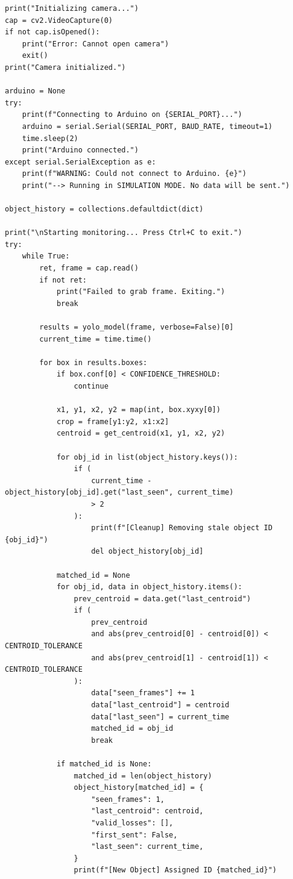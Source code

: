 \begin{verbatim}
print("Initializing camera...")
cap = cv2.VideoCapture(0)
if not cap.isOpened():
    print("Error: Cannot open camera")
    exit()
print("Camera initialized.")

arduino = None
try:
    print(f"Connecting to Arduino on {SERIAL_PORT}...")
    arduino = serial.Serial(SERIAL_PORT, BAUD_RATE, timeout=1)
    time.sleep(2)
    print("Arduino connected.")
except serial.SerialException as e:
    print(f"WARNING: Could not connect to Arduino. {e}")
    print("--> Running in SIMULATION MODE. No data will be sent.")

object_history = collections.defaultdict(dict)

print("\nStarting monitoring... Press Ctrl+C to exit.")
try:
    while True:
        ret, frame = cap.read()
        if not ret:
            print("Failed to grab frame. Exiting.")
            break

        results = yolo_model(frame, verbose=False)[0]
        current_time = time.time()

        for box in results.boxes:
            if box.conf[0] < CONFIDENCE_THRESHOLD:
                continue

            x1, y1, x2, y2 = map(int, box.xyxy[0])
            crop = frame[y1:y2, x1:x2]
            centroid = get_centroid(x1, y1, x2, y2)

            for obj_id in list(object_history.keys()):
                if (
                    current_time - object_history[obj_id].get("last_seen", current_time)
                    > 2
                ):
                    print(f"[Cleanup] Removing stale object ID {obj_id}")
                    del object_history[obj_id]

            matched_id = None
            for obj_id, data in object_history.items():
                prev_centroid = data.get("last_centroid")
                if (
                    prev_centroid
                    and abs(prev_centroid[0] - centroid[0]) < CENTROID_TOLERANCE
                    and abs(prev_centroid[1] - centroid[1]) < CENTROID_TOLERANCE
                ):
                    data["seen_frames"] += 1
                    data["last_centroid"] = centroid
                    data["last_seen"] = current_time
                    matched_id = obj_id
                    break

            if matched_id is None:
                matched_id = len(object_history)
                object_history[matched_id] = {
                    "seen_frames": 1,
                    "last_centroid": centroid,
                    "valid_losses": [],
                    "first_sent": False,
                    "last_seen": current_time,
                }
                print(f"[New Object] Assigned ID {matched_id}")


\end{verbatim}
